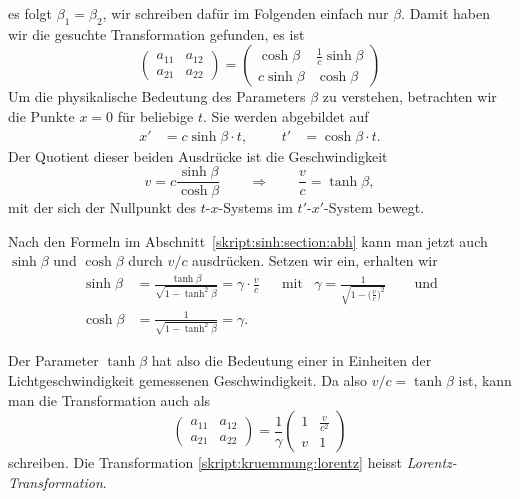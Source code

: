 es folgt $\beta_1=\beta_2$, wir schreiben dafür im Folgenden einfach
nur $\beta$.
Damit haben wir die gesuchte Transformation gefunden, es ist
\begin{equation}
\begin{pmatrix}
a_{11}&a_{12}\\
a_{21}&a_{22}
\end{pmatrix}
=
\begin{pmatrix}
 \cosh\beta&\frac1c\sinh\beta\\
c\sinh\beta&\cosh\beta
\end{pmatrix}
\end{equation}
Um die physikalische Bedeutung des Parameters $\beta$ zu verstehen, 
betrachten wir die Punkte $x=0$ für beliebige $t$.
Sie werden abgebildet auf
\[
\begin{aligned}
x' &= c\sinh\beta \cdot t,
&
&&
t' &=  \cosh\beta \cdot t.
\end{aligned}
\]
Der Quotient dieser beiden Ausdrücke ist die Geschwindigkeit
\[
v = c\frac{\sinh\beta}{\cosh\beta}
\qquad\Rightarrow\qquad
\frac{v}{c}
=
\tanh\beta,
\]
mit der sich der Nullpunkt des $t$-$x$-Systems im $t'$-$x'$-System
bewegt.

Nach den Formeln im Abschnitt~\ref{skript:sinh:section:abh} kann 
man jetzt auch $\sinh\beta$ und $\cosh\beta$ durch $v/c$ ausdrücken.
Setzen wir ein, erhalten wir
\[
\begin{aligned}
\sinh\beta
&=
\frac{\tanh\beta}{\sqrt{1-\tanh^2\beta}}
=
\gamma\cdot\frac{v}{c}
&
&\text{mit}&
\gamma = \frac{1}{\displaystyle\sqrt{1-\biggl(\frac{v}{c}\biggr)^2}}
\qquad\text{und}
\\
\cosh\beta
&=
\frac1{\sqrt{1-\tanh^2\beta}}
=
\gamma.
\end{aligned}
\]

Der Parameter $\tanh\beta$ hat also die Bedeutung einer in Einheiten
der Lichtgeschwindigkeit gemessenen Geschwindigkeit.
Da also $v/c=\tanh\beta$ ist, kann man die Transformation auch
als
\begin{equation}
\begin{pmatrix}
a_{11}&a_{12}\\
a_{21}&a_{22}
\end{pmatrix}
=
\frac{1}{\gamma}
\begin{pmatrix}
\displaystyle 1
	& \displaystyle\frac{v}{c^2}
\\
\displaystyle v
	&\displaystyle 1
\end{pmatrix}
\label{skript:kruemmung:lorentz}
\end{equation}
schreiben.
Die Transformation 
\eqref{skript:kruemmung:lorentz}
heisst {\em Lorentz-Transformation}.
%

